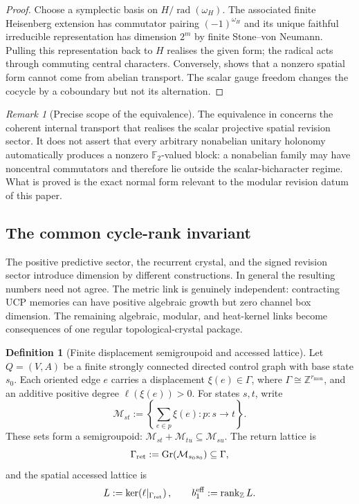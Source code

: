 \documentclass[11pt]{article}
\theoremstyle{definition}
\newtheorem{definition}[theorem]{Definition}
\theoremstyle{remark}
\newtheorem{remark}[theorem]{Remark}
\newcommand{\Z}{\mathbb{Z}}
\newcommand{\F}{\mathbb{F}}
\newcommand{\rad}{\operatorname{rad}}
\newcommand{\M}{\mathcal{M}}
\newcommand{\rmon}{r_{\mathrm{mon}}}
\newcommand{\beff}{b_1^{\mathrm{eff}}}
\newcommand{\Lat}{L}
\newcommand{\rank}{\operatorname{rank}}
\newcommand{\Gr}{\operatorname{Gr}}
\begin{document}
\begin{proof}
Choose a symplectic basis on $H/\rad(\omega_H)$.  The associated finite
Heisenberg extension has commutator pairing $(-1)^{\omega_H}$ and its unique
faithful irreducible representation has dimension $2^m$ by finite
Stone--von Neumann.  Pulling this representation back to $H$ realises the given
form; the radical acts through commuting central characters.  Conversely,
 shows that a nonzero spatial form cannot
come from abelian transport.  The scalar gauge freedom changes the cocycle by a
coboundary but not its alternation.
\end{proof}

\begin{remark}[Precise scope of the equivalence]
\label{rem:holonomy-equivalence-scope}
The equivalence in  concerns the coherent
internal transport that realises the scalar projective spatial revision sector.
It does not assert that every arbitrary nonabelian unitary holonomy automatically
produces a nonzero $\F_2$-valued block: a nonabelian family may have noncentral
commutators and therefore lie outside the scalar-bicharacter regime.  What is
proved is the exact normal form relevant to the modular revision datum of this
paper.
\end{remark}

\subsection{The common cycle-rank invariant}
\label{subsec:dimension-coincidence}

The positive predictive sector, the recurrent crystal, and the signed revision
sector introduce dimension by different constructions.  In general the resulting
numbers need not agree.  The metric link is genuinely independent: contracting
UCP memories can have positive algebraic growth but zero channel box dimension.
The remaining algebraic, modular, and heat-kernel links become consequences of
one regular topological-crystal package.

\begin{definition}[Finite displacement semigroupoid and accessed lattice]
\label{def:displacement-semigroupoid}
Let \(Q=(V,A)\) be a finite strongly connected directed control graph with base
state \(s_0\).  Each oriented edge \(e\) carries a displacement
\(\xi(e)\in\Gamma\), where \(\Gamma\cong\Z^{\rmon}\), and an additive positive
degree \(\ell(\xi(e))>0\).  For states \(s,t\), write
\[
 \M_{st}:=\left\{\sum_{e\in p}\xi(e):p:s\to t\right\}.
\]
These sets form a semigroupoid:
\(\M_{st}+\M_{tu}\subseteq\M_{su}\).  The return lattice is
\[
 \Gamma_{\rm ret}:=\Gr(\M_{s_0s_0})\subseteq\Gamma ,
\]
and the spatial accessed lattice is
\[
 \Lat:=\ker\!\left(\ell|_{\Gamma_{\rm ret}}\right),
 \qquad
 \beff:=\rank_{\Z}\Lat.
\]
\end{definition}
\end{document}

